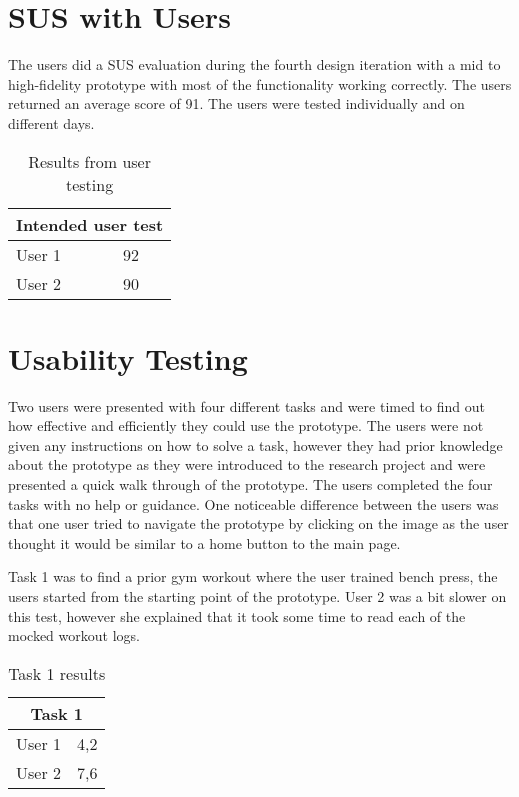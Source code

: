\section{SUS with Users}\label{susu}
The users did a SUS evaluation during the fourth design iteration with a mid to high-fidelity prototype with most of the functionality working correctly. The users returned an average score of 91. The users were tested individually and on different days.
\begin{table}[H]
\centering
\begin{tabular}{ |l|l| }
  \hline
  \multicolumn{2}{|c|}{Intended user test} \\
  \hline
User 1 & 92\\ 
\hline
User 2 & 90\\
\hline
\end{tabular}
\caption{Results from user testing}
\end{table}

\section{Usability Testing}\label{usat}
Two users were presented with four different tasks and were timed to find out how effective and efficiently they could use the prototype. The users were not given any instructions on how to solve a task, however they had prior knowledge about the prototype as they were introduced to the research project and were presented a quick walk through of the prototype. The users completed the four tasks with no help or guidance. One noticeable difference between the users was that one user tried to navigate the prototype by clicking on the image as the user thought it would be similar to a home button to the main page.

Task 1 was to find a prior gym workout where the user trained bench press, the users started from the starting point of the prototype. User 2 was a bit slower on this test, however she explained that it took some time to read each of the mocked workout logs.
\begin{table}[H]
\centering
\begin{tabular}{ |l|l| }
  \hline
  \multicolumn{2}{|c|}{Task 1} \\
  \hline
User 1 & 4,2\\ 
\hline
User 2 & 7,6\\
\hline
\end{tabular}
\caption{Task 1 results}
\end{table}

